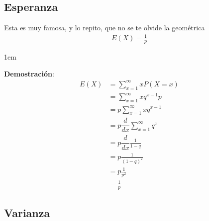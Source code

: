 \documentclass[12pt, fleqn]{report}                             %
\newenvironment{SmallIndentation}[1][0.75em]                    %
        {\begin{adjustwidth}{#1}{}\begin{footnotesize}}             %
        {\end{footnotesize}\end{adjustwidth}}                       %
\theoremstyle{break}                                            %
\newcommand \MiniDerivate[1][x]   {\dfrac{d}{d #1}}             %
\begin{document}
            \clearpage
            \subsection{Esperanza}

                Esta es muy famosa, y lo repito, que no se te olvide la geométrica
                \begin{align*}
                    E(X) = \frac{1}{p}
                \end{align*}

                \begin{SmallIndentation}[1em]
                    \textbf{Demostración}:
                    \begin{align*}
                         E(X)
                            &= \sum_{x=1}^\infty xP(X = x)                          \\
                            &= \sum_{x=1}^\infty x q^{x - 1}p                       \\
                            &= p\sum_{x=1}^\infty x q^{x - 1}                       \\
                            &= p \MiniDerivate \sum_{x=1}^\infty q^x                \\
                            &= p \MiniDerivate \frac{1}{1 - q}                      \\
                            &= p \frac{1}{(1- q)^2}                                 \\
                            &= p \frac{1}{p^2}                                      \\
                            &= \frac{1}{p}                                  
                    \end{align*}    
                
                \end{SmallIndentation}
                      
            \clearpage
            \subsection{Varianza}
\end{document}
